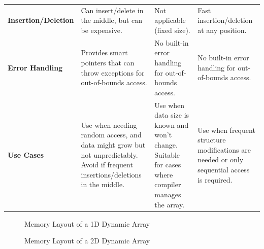 \begin{table}[h]
\begin{tabularx}{\textwidth}{lXXX}
        \textbf{Insertion/Deletion} & Can insert/delete in the middle, but can be expensive.                                                                           & Not applicable (fixed size).                                                                       & Fast insertion/deletion at any position.                                                    \\
        \textbf{Error Handling}     & Provides smart pointers that can throw exceptions for out-of-bounds access.                                                      & No built-in error handling for out-of-bounds access.                                               & No built-in error handling for out-of-bounds access.                                        \\
        \textbf{Use Cases}          & Use when needing random access, and data might grow but not unpredictably. Avoid if frequent insertions/deletions in the middle. & Use when data size is known and won't change. Suitable for cases where compiler manages the array. & Use when frequent structure modifications are needed or only sequential access is required. \\
        \bottomrule
    \end{tabularx}
\end{table} \label{table:array}

\begin{figure}[h]
    \centering
    \caption{Memory Layout of a 1D Dynamic Array}
\end{figure}

\begin{figure}[h]
    \centering
    \caption{Memory Layout of a 2D Dynamic Array}
\end{figure}

